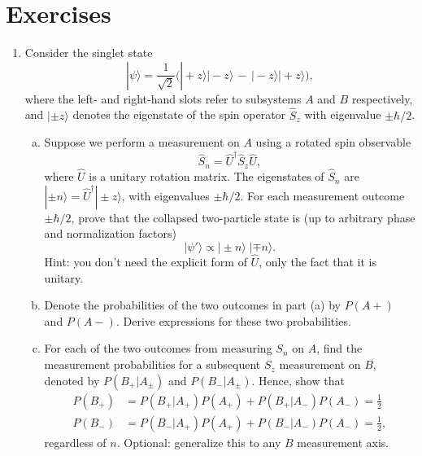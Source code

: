 \documentclass[pra,12pt]{revtex4-2}
\begin{document}
\section*{Exercises}

\begin{enumerate}

\item Consider the singlet state
\begin{equation}
  |\psi\rangle = \frac{1}{\sqrt{2}} \Big(|\!+\!z\rangle|\!-\!z\rangle \,-\, |\!-\!z\rangle|\!+\!z\rangle\Big),
\end{equation}
where the left- and right-hand slots refer to subsystems $A$ and $B$
respectively, and $|\pm\!z\rangle$ denotes the eigenstate of the spin
operator $\hat{S}_z$ with eigenvalue $\pm\hbar/2$.
\begin{enumerate}[(a)]
\item Suppose we perform a measurement on $A$ using a rotated spin
  observable
\begin{equation}
  \hat{S}_n = \hat{U}^\dagger \hat{S}_z \hat{U},
\end{equation}
where $\hat{U}$ is a unitary rotation matrix.  The eigenstates of
$\hat{S}_n$ are $|\pm n\rangle = \hat{U}^\dagger |\pm z\rangle$, with
eigenvalues $\pm \hbar/2$.  For each measurement outcome $\pm\hbar/2$,
prove that the collapsed two-particle state is (up to arbitrary phase
and normalization factors)
\begin{equation}
  |\psi'\rangle \propto |\pm \!n \rangle\; |\mp\! n\rangle.
\end{equation}
Hint: you don't need the explicit form of $\hat{U}$, only the fact
that it is unitary.

\item Denote the probabilities of the two outcomes in part (a) by
  $P(A+)$ and $P(A-)$.  Derive expressions for these two
  probabilities.

\item For each of the two outcomes from measuring $S_n$ on $A$, find
  the measurement probabilities for a subsequent $S_z$ measurement on
  $B$, denoted by $P(B_+|A_\pm)$ and $P(B_-|A_\pm)$.  Hence, show that
  \begin{align}
    P(B_+) &= P(B_+|A_+) P(A_+) + P(B_+|A_-) P(A_-) = \frac{1}{2}\\
    P(B_-) &= P(B_-|A_+) P(A_+) + P(B_-|A_-) P(A_-) = \frac{1}{2},
  \end{align}
  regardless of $n$.  Optional: generalize this to any $B$ measurement
  axis.


\end{enumerate}
\end{enumerate}
\end{document}
